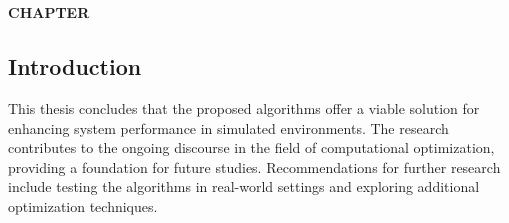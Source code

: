 \chapter*{}  %

\setcounter{chapter}{6}  %
\setcounter{section}{0}  %
\setcounter{subsection}{0}  %
\setcounter{subsubsection}{0}  %

\vspace*{-50mm}


\vspace*{10mm}  %

\begin{center}
    \textbf{CHAPTER \thechapter}\\
    \vspace{5mm}  %
    \textbf{\chapterSIXtopic}
\end{center}

\vspace{10mm}  %

\section{Introduction}

\setlength{\parindent}{1cm}  %

\begin{spacing}{2}  %

This thesis concludes that the proposed algorithms offer a viable solution for enhancing system performance in simulated environments. The research contributes to the ongoing discourse in the field of computational optimization, providing a foundation for future studies. Recommendations for further research include testing the algorithms in real-world settings and exploring additional optimization techniques.

\end{spacing}
